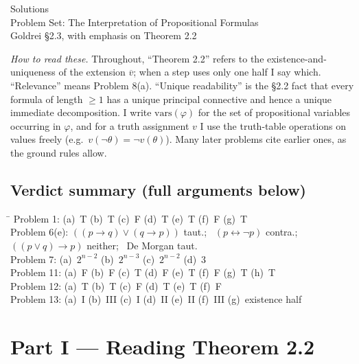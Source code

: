 \documentclass[11pt]{article}
\newcommand{\ext}[1]{\overline{#1}}
\newcommand{\vars}{\mathrm{vars}}
\begin{document}
\begin{center}
{\LARGE Solutions}\\[3pt]
{\large Problem Set: The Interpretation of Propositional Formulas}\\[2pt]
{\large Goldrei \S 2.3, with emphasis on Theorem 2.2}
\end{center}

\bigskip

\noindent\emph{How to read these.} Throughout, ``Theorem 2.2'' refers to the
existence-and-uniqueness of the extension $\ext{v}$; when a step uses only one
half I say which. ``Relevance'' means Problem 8(a). ``Unique readability'' is the
\S 2.2 fact that every formula of length $\ge 1$ has a unique principal connective
and hence a unique immediate decomposition. I write $\vars(\varphi)$ for the set
of propositional variables occurring in $\varphi$, and for a truth assignment $v$
I use the truth-table operations on values freely (e.g.\ $v(\lnot\theta)=\lnot
v(\theta)$). Many later problems cite earlier ones, as the ground rules allow.

\subsection*{Verdict summary (full arguments below)}

\begin{tabbing}
\hspace{3.3cm}\=\kill
Problem 1: \> (a)~T \quad(b)~T \quad(c)~F \quad(d)~T \quad(e)~T \quad(f)~F \quad(g)~T\\[2pt]
Problem 6(e): \> $((p\to q)\lor(q\to p))$ taut.; \ $(p\leftrightarrow\lnot p)$ contra.; \ $((p\lor q)\to p)$ neither; \ De Morgan taut.\\[2pt]
Problem 7: \> (a)~$2^{n-2}$ \quad(b)~$2^{n-3}$ \quad(c)~$2^{n-2}$ \quad(d)~$3$\\[2pt]
Problem 11: \> (a)~F \quad(b)~F \quad(c)~T \quad(d)~F \quad(e)~T \quad(f)~F \quad(g)~T \quad(h)~T\\[2pt]
Problem 12: \> (a)~T \quad(b)~T \quad(c)~F \quad(d)~T \quad(e)~T \quad(f)~F\\[2pt]
Problem 13: \> (a)~I \quad(b)~III \quad(c)~I \quad(d)~II \quad(e)~II \quad(f)~III \quad(g)~existence half\\
\end{tabbing}

\section*{Part I --- Reading Theorem 2.2}
\end{document}
